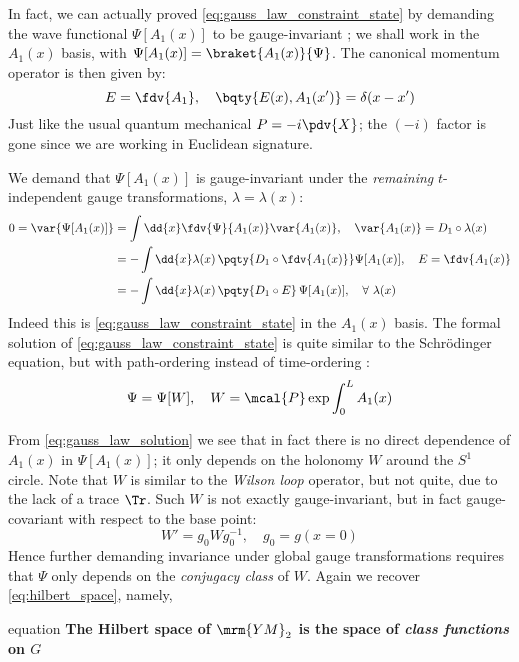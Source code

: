 \documentclass[a4paper
	,10pt
]{article}
\newcommand{\YM}{{\ensuremath{\mrm{YM}_2}}\xspace}
\begin{document}
	In fact, we can actually proved \eqref{eq:gauss_law_constraint_state} by demanding the wave functional $\Psi[A_1(x)]$ to be gauge-invariant \cite{Hatfield:234595}; we shall work in the $A_1(x)$ basis, with $\Psi[A_1(x)] = \braket{A_1(x)}{\Psi}$. 
	The canonical momentum operator is then given by:
	\begin{equation}
		E = \fdv{A_1},
	\quad
		\bqty{
			E(x), A_1(x')
		} = \delta(x - x')
	\end{equation}
	Just like the usual quantum mechanical $P = - i\pdv{X}$; the $(-i)$ factor is gone since we are working in Euclidean signature. 
	
	We demand that $\Psi[A_1(x)]$ is gauge-invariant under the \textit{remaining} $t$-independent gauge transformations, $\lambda = \lambda(x)$:
	\begin{equation}
	\begin{aligned}
		0 = \var{\Psi[A_1(x)]}
		&= \int \dd{x}
			\fdv{\Psi}{A_1(x)} \var{A_1(x)},
		\quad \var{A_1(x)} = D_1 \circ \lambda(x) \\
		&= -\int \dd{x}
			\lambda(x)\,
			\pqty{D_1 \circ \fdv{A_1(x)}}
			\Psi[A_1(x)],
		\quad E = \fdv{A_1(x)} \\
		&= -\int \dd{x}
			\lambda(x)\,
			\pqty{D_1 \circ E}\,
			\Psi[A_1(x)],
		\quad \forall\ \lambda(x)
	\end{aligned}
	\end{equation}
	Indeed this is \eqref{eq:gauss_law_constraint_state} in the $A_1(x)$ basis. The formal solution of \eqref{eq:gauss_law_constraint_state} is quite similar to the Schr\"odinger equation, but with path-ordering instead of time-ordering \cite{Minahan:1993np}:
	\begin{equation}
		\Psi = \Psi[W],
	\quad
		W = \mcal{P} \exp \int_0^L A_1(x)
	\label{eq:gauss_law_solution}
	\end{equation}
	
	From \eqref{eq:gauss_law_solution} we see that in fact there is no direct dependence of $A_1(x)$ in $\Psi[A_1(x)]$; it only depends on the holonomy $W$ around the $S^1$ circle. Note that $W$ is similar to the \textit{Wilson loop} operator, but not quite, due to the lack of a trace $\Tr$. Such $W$ is not exactly gauge-invariant, but in fact gauge-covariant with respect to the base point:
	\begin{equation}
		W' = g_0 W g_0^{-1},
	\quad
		g_0 = g(x = 0)
	\end{equation}
	Hence further demanding invariance under global gauge transformations requires that $\Psi$ only depends on the \textit{conjugacy class} of $W$. Again we recover \eqref{eq:hilbert_space}, namely,
	\begin{empheq}{equation}
		\textbf{
			The Hilbert space of \YM is the space of \textit{class functions} on $G$
		}
	\end{empheq}
	
\end{document}

